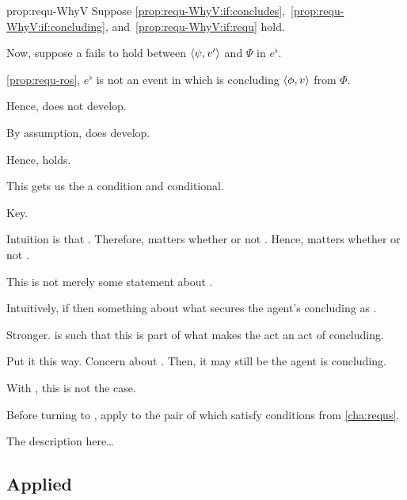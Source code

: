 \begin{note}
  \begin{argument}{prop:requ-WhyV}
    Suppose \ref{prop:requ-WhyV:if:concludes},~\ref{prop:requ-WhyV:if:concluding}, and~\ref{prop:requ-WhyV:if:requ} hold.

    Now, suppose a \ros{} fails to hold between \(\langle \psi, v' \rangle\) and \(\Psi\) in \(e^{\flat}\).

    \autoref{prop:requ-ros}, \(e^{\flat}\) is not an event in which \vAgent{} is concluding \(\langle \phi, v \rangle\) from \(\Phi\).

    Hence, does not develop.

    By assumption, does develop.

    Hence, \ros{} holds.

    This gets us the a condition and conditional.
  \end{argument}
\end{note}

\begin{note}
  Key.

  Intuition is that \tR[concluding]{}.
  Therefore, matters whether or not \fc{}.
  Hence, matters whether or not \ros{}.
\end{note}

\begin{note}
  This is not merely some statement about \tR[concluding]{}.

  Intuitively, if \tR[concluding]{} then something about what secures the agent's concluding as .

  Stronger.
  \requ{} is such that this is part of what makes the act an act of concluding.

  Put it this way.
  Concern about .
  Then, it may still be the agent is concluding.

  With \requ{}, this is not the case.
\end{note}

\begin{note}
  Before turning to \issueConstraint{}, apply to the pair of  which satisfy conditions from \autoref{cha:requs}.
\end{note}

\begin{note}
  \color{blue}

  The description here\dots
\end{note}

\subsection{Applied}
\label{sec:consequences}


